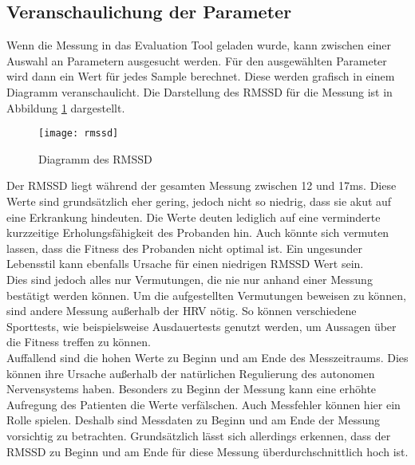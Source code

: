 \subsection{Veranschaulichung der Parameter} \label{sec:anschaulich}
Wenn die Messung in das Evaluation Tool geladen wurde, kann zwischen einer Auswahl an Parametern ausgesucht werden. Für den ausgewählten Parameter wird dann ein Wert für jedes Sample berechnet. Diese werden grafisch in einem Diagramm veranschaulicht. Die Darstellung des \acs{RMSSD} für die Messung ist in Abbildung \ref{fig:rmssd} dargestellt.
\begin{figure}[H]
	\centering
	\texttt{[image: rmssd]}
	\caption{Diagramm des RMSSD}
	\label{fig:rmssd}
\end{figure}
Der RMSSD liegt während der gesamten Messung zwischen 12 und 17ms. Diese Werte sind grundsätzlich eher gering, jedoch nicht so niedrig, dass sie akut auf eine Erkrankung hindeuten. Die Werte deuten lediglich auf eine verminderte kurzzeitige Erholungsfähigkeit des Probanden hin. Auch könnte sich vermuten lassen, dass die Fitness des Probanden nicht optimal ist. Ein ungesunder Lebensstil kann ebenfalls Ursache für einen niedrigen \acs{RMSSD} Wert sein. \\
Dies sind jedoch alles nur Vermutungen, die nie nur anhand einer Messung bestätigt werden können. Um die aufgestellten Vermutungen beweisen zu können, sind andere Messung außerhalb der \acs{HRV} nötig. So können verschiedene Sporttests, wie beispielsweise Ausdauertests genutzt werden, um Aussagen über die Fitness treffen zu können.\\
Auffallend sind die hohen Werte zu Beginn und am Ende des Messzeitraums. Dies können ihre Ursache außerhalb der natürlichen Regulierung des autonomen Nervensystems haben. Besonders zu Beginn der Messung kann eine erhöhte Aufregung des Patienten die Werte verfälschen. Auch Messfehler können hier ein Rolle spielen. Deshalb sind Messdaten zu Beginn und am Ende der Messung vorsichtig zu betrachten. Grundsätzlich lässt sich allerdings erkennen, dass der \acs{RMSSD} zu Beginn und am Ende für diese Messung überdurchschnittlich hoch ist.


